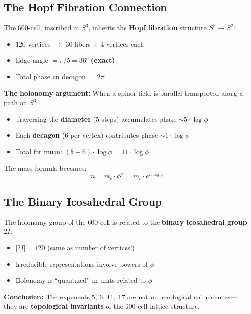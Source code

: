 \documentclass[12pt,a4paper]{article}
\begin{document}
\subsection{The Hopf Fibration Connection}

The 600-cell, inscribed in $S^3$, inherits the \textbf{Hopf fibration} structure $S^3 \to S^2$:

\begin{itemize}
    \item 120 vertices $\to$ 30 fibers $\times$ 4 vertices each
    \item Edge angle $= \pi/5 = 36°$ \textbf{(exact)}
    \item Total phase on decagon $= 2\pi$
\end{itemize}

\textbf{The holonomy argument:} When a spinor field is parallel-transported along a path on $S^3$:
\begin{itemize}
    \item Traversing the \textbf{diameter} (5 steps) accumulates phase $\sim 5 \cdot \log\phi$
    \item Each \textbf{decagon} (6 per vertex) contributes phase $\sim 1 \cdot \log\phi$
    \item Total for muon: $(5 + 6) \cdot \log\phi = 11 \cdot \log\phi$
\end{itemize}

The mass formula becomes:
\begin{equation}
m = m_e \cdot \phi^n = m_e \cdot e^{n \log\phi}
\end{equation}

\subsection{The Binary Icosahedral Group}

The holonomy group of the 600-cell is related to the \textbf{binary icosahedral group} $2I$:
\begin{itemize}
    \item $|2I| = 120$ (same as number of vertices!)
    \item Irreducible representations involve powers of $\phi$
    \item Holonomy is ``quantized'' in units related to $\phi$
\end{itemize}

\textbf{Conclusion:} The exponents 5, 6, 11, 17 are not numerological coincidences---they are \textbf{topological invariants} of the 600-cell lattice structure.
\end{document}
